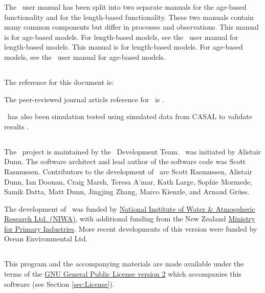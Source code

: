 The \CNAME\ user manual has been split into two separate manuals for the age-based functionality and for the length-based functionality. These two manuals contain many common components but differ in processes and observations. \ifAgeBased
This manual is for age-based models. For length-based models, see the \CNAME\ user manual for length-based models. 
\else
This manual is for length-based models. For age-based models, see the \CNAME\ user manual for age-based models. 
\fi %


\subsection{}

The reference for this document is: \ManualRef

The peer-reviewed journal article reference for \CNAME\ is \cite{doonan_casal2}.

\CNAME\ has also been simulation tested using simulated data from CASAL to validate results \citep{dunn_integrated_2022}.

\subsection{}

The \CNAME\ project is maintained by the \CNAME\ Development Team. \CNAME\ was initiated by Alistair Dunn. The software architect and lead author of the software code was Scott Rasmussen. Contributors to the development of \CNAME\ are Scott Rasmussen, Alistair Dunn, Ian Doonan, Craig Marsh, Teresa A'mar, Kath Large, Sophie Mormede, Samik Datta, Matt Dunn, Jingjing Zhang, Marco Kienzle, and Arnaud Gr\"{u}ss.

The development of \CNAME\ was funded by \href{http://www.niwa.co.nz}{National Institute of Water \& Atmospheric Research Ltd. (NIWA)}, with additional funding from the New Zealand \href{http://www.mpi.govt.nz}{Ministry for Primary Industries}. More recent developments of this version were funded by Ocean Environmental Ltd.

\subsection{}

This program and the accompanying materials are made available under the terms of the \href{http://www.opensource.org/licenses/GPL-2.0}{GNU General Public License version 2} which accompanies this software (see Section \ref{sec:License}).

